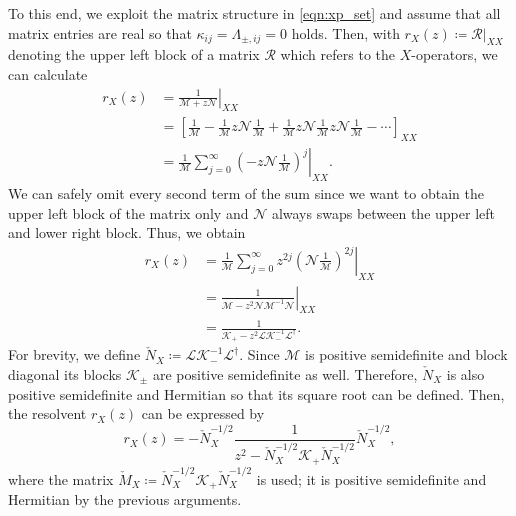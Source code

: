 \documentclass[
    reprint, 
    aps,
    preprintnumbers,
    twocolumn,
    prb,
    superscriptaddress
]{revtex4-2}
\newcommand{\mM}{\mathcal{M}}
\newcommand{\mN}{\mathcal{N}}
\newcommand{\bs}{\begin{subequations}}
\newcommand{\es}{\end{subequations}}
\begin{document}
To this end, we exploit the matrix structure in \eqref{eqn:xp_set} 
and assume that all matrix entries are real so that $\kappa_{ij} = \Lambda_{\pm,ij} = 0$ holds.
Then, with $r_X(z)\coloneqq\mathcal{R}|_{XX}$ denoting the upper left block of a matrix $\mathcal{R}$ which 
refers to the $X$-operators, we can calculate
\bs
\begin{align}
    r_X (z) & = \left. \frac{1}{\mM + z \mN} \right\vert_{XX} \\
        &= \left[ \frac{1}{\mM} - \frac{1}{\mM} z \mN \frac{1}{\mM} + 
				\frac{1}{\mM} z \mN \frac{1}{\mM} z \mN \frac{1}{\mM} - \cdots \right]_{XX}  \\
        &= \left. \frac{1}{\mM} \sum_{j=0}^\infty \left( -z \mN \frac{1}{\mM} \right)^j \right\vert_{XX} .
\end{align}
\es
We can safely omit every second term of the sum since we want to obtain the upper left block of the matrix only
and $\mN$ always swaps between the upper left and lower right block. Thus, we obtain
\bs
\begin{align}
    r_X (z) &= \left. \frac{1}{\mM} \sum_{j=0}^\infty z^{2j} \left( \mN \frac{1}{\mM} \right)^{2j} \right\vert_{XX} 
		\\
        &= \left. \frac{1}{\mM - z^2 \mN \mM^{-1} \mN} \right\vert_{XX} 
				\\
        &= \frac{1}{\mathcal{K}_+ - z^2 \mathcal{L} \mathcal{K}_-^{-1} \mathcal{L}^\dagger}.
\end{align}
\es
For brevity, we define $\check{N}_X \coloneqq \mathcal{L} \mathcal{K}_-^{-1} \mathcal{L}^\dagger$.
Since $\mathcal{M}$ is positive semidefinite and block diagonal its blocks $\mathcal{K}_\pm$ are positive semidefinite as well.
Therefore, $\check{N}_X$ is also positive semidefinite and Hermitian so that its square root can be defined.
Then, the resolvent $r_X(z)$ can be expressed by
\begin{equation}
    \label{eqn:rx}
    r_X (z) = -\check{N}_X^{-1/2} \frac{1}{z^2 - \check{N}_X^{-1/2} \mathcal{K}_+ \check{N}_X^{-1/2}} 
		\check{N}_X^{-1/2},
\end{equation}
where the matrix $\check{M}_X \coloneqq \check{N}_X^{-1/2} \mathcal{K}_+ \check{N}_X^{-1/2}$ is used; it is
positive semidefinite and Hermitian by the previous arguments.
\end{document}
